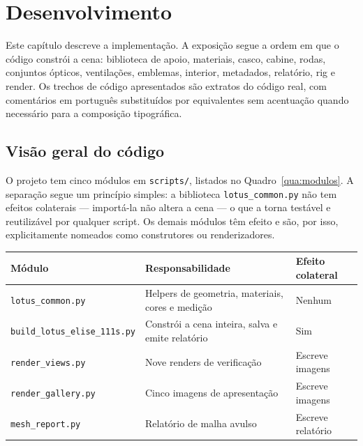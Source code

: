 \chapter{Desenvolvimento}\label{ch:desenvolvimento}

Este cap\'itulo descreve a implementa{\c{c}}\~ao. A exposi{\c{c}}\~ao segue a ordem em que o
c\'odigo constr\'oi a cena: biblioteca de apoio, materiais, casco, cabine, rodas, conjuntos
\'opticos, ventila{\c{c}}\~oes, emblemas, interior, metadados, relat\'orio, rig e render. Os
trechos de c\'odigo apresentados s\~ao extratos do c\'odigo real, com coment\'arios em
portugu\^es substitu\'idos por equivalentes sem acentua{\c{c}}\~ao quando necess\'ario para a
composi{\c{c}}\~ao tipogr\'afica.

\section{Vis\~ao geral do c\'odigo}\label{sec:codigo}

O projeto tem cinco m\'odulos em \texttt{scripts/}, listados no
Quadro~\ref{qua:modulos}. A separa{\c{c}}\~ao segue um princ\'ipio simples: a biblioteca
\texttt{lotus\_common.py} n\~ao tem efeitos colaterais --- import\'a-la n\~ao altera a cena ---
o que a torna test\'avel e reutiliz\'avel por qualquer script. Os demais m\'odulos t\^em efeito
e s\~ao, por isso, explicitamente nomeados como construtores ou renderizadores.

\begin{quadro}[htbp]
\centering
\caption{M\'odulos do projeto e responsabilidade}
\label{qua:modulos}
\footnotesize
\begin{tabular}{>{\raggedright\arraybackslash}p{4.6cm}>{\raggedright\arraybackslash}p{4.2cm}>{\raggedright\arraybackslash}p{4.0cm}}
\toprule
\textbf{M\'odulo} & \textbf{Responsabilidade} & \textbf{Efeito colateral} \\
\midrule
\texttt{lotus\_common.py} & Helpers de geometria, materiais, cores e medi{\c{c}}\~ao & Nenhum \\
\texttt{build\_lotus\_elise\_111s.py} & Constr\'oi a cena inteira, salva e emite relat\'orio & Sim \\
\texttt{render\_views.py} & Nove renders de verifica{\c{c}}\~ao & Escreve imagens \\
\texttt{render\_gallery.py} & Cinco imagens de apresenta{\c{c}}\~ao & Escreve imagens \\
\texttt{mesh\_report.py} & Relat\'orio de malha avulso & Escreve relat\'orio \\
\bottomrule
\end{tabular}
\end{quadro}

